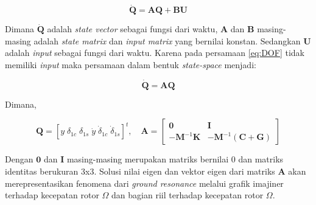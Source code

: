\begin{equation}
	\label{eq:AdanQ}
	\mathbf{\dot{Q}}=\mathbf{AQ}+\mathbf{BU}
\end{equation}

Dimana $\mathbf{\dot{Q}}$ adalah \textit{state vector} sebagai fungsi dari waktu, $\mathbf{A}$ dan $\mathbf{B}$ masing-masing adalah \textit{state matrix} dan \textit{input matrix} yang bernilai konstan. Sedangkan $\mathbf{U}$ adalah \textit{input} sebagai fungsi dari waktu. Karena pada persamaan \ref{eq:DOF} tidak memiliki \textit{input} maka persamaan dalam bentuk \textit{state-space} menjadi:

\begin{equation}
	\label{eq:state-space_simplified}
	\mathbf{\dot{Q}}=\mathbf{AQ}
\end{equation}

Dimana,

\begin{equation}
	\label{eq:state-space}
	\mathbf{Q}=[y \; \delta_{1c} \; \delta_{1s} \; \dot{y} \; \dot{\delta}_{1c} \; \dot{\delta}_{1s}]^t, \quad
	\mathbf{A}=\begin{bmatrix}
		\mathbf{0}& \mathbf{I}\\
		\mathbf{-M}^{-1}\mathbf{K}& \mathbf{-M}^{-1}(\mathbf{C}+\mathbf{G})
	\end{bmatrix}	
\end{equation}

Dengan $\mathbf{0}$ dan $\mathbf{I}$ masing-masing merupakan matriks bernilai $0$ dan matriks identitas berukuran 3x3. Solusi nilai eigen dan vektor eigen dari matriks $\mathbf{A}$ akan merepresentasikan fenomena dari \textit{ground resonance} melalui grafik imajiner terhadap kecepatan rotor $\Omega$ dan bagian riil terhadap kecepatan rotor $\Omega$.